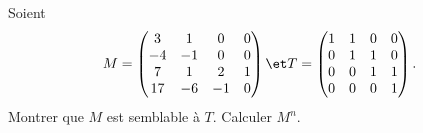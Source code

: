 \begin{enonce}
\begin{exercise}[ID={RMS/124/E1181 écoles des mines PSI},subtitle={},tags={}]
Soient 
\begin{equation*}
  M= \begin{pmatrix}
  3&1&0&0\\
  -4&-1&0&0\\
  7&1&2&1\\
  17&-6&-1&0
  \end{pmatrix}
  \et
  T= \begin{pmatrix}
  1&1&0&0\\
  0&1&1&0\\
  0&0&1&1\\
  0&0&0&1
  \end{pmatrix}.
\end{equation*}
Montrer que $M$ est semblable à $T$.
Calculer $M^n$.
\end{exercise}
\begin{solution}
\end{solution}
\end{enonce}
